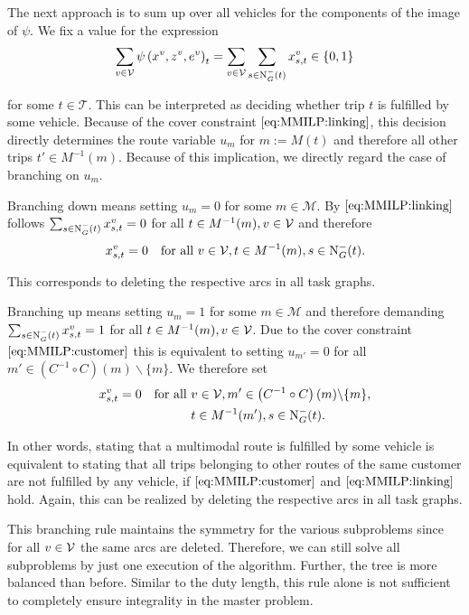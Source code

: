 The next approach is to sum up over all vehicles for the components of the image of $\psi$. We fix a value for the expression
\begin{align*}
	\sum_{v\in\mathcal{V}}\psi\left(x^v,z^v,e^v\right)_t = \sum_{v\in\mathcal{V}} \sum_{s\in\operatorname{N}_G^-(t)} x^v_{s,t} \in\left\{0,1\right\}
\end{align*}

for some $t\in\mathcal{T}$. This can be interpreted as deciding whether trip $t$ is fulfilled by some vehicle. Because of the cover constraint $\eqref{eq:MMILP:linking}$, this decision directly determines the route variable $u_m$ for ${m := M(t)}$ and therefore all other trips ${t'\in M^{-1}(m)}$. Because of this implication, we directly regard the case of branching on $u_m$.

Branching down means setting ${u_m = 0}$ for some ${m\in\mathcal{M}}$. By $\eqref{eq:MMILP:linking}$ follows\linebreak
${\sum_{s\in\operatorname{N}_G^-(t)}x_{s,t}^v = 0}$ for all ${t\in M^{-1}(m)}, v\in\mathcal{V}$ and therefore
\begin{align*}
	x^v_{s,t} = 0 && \text{for all } v\in\mathcal{V}, t\in M^{-1}(m), s\in\operatorname{N}_G^-(t).
\end{align*}

This corresponds to deleting the respective arcs in all task graphs.

Branching up means setting ${u_m = 1}$ for some ${m\in\mathcal{M}}$ and therefore demanding\linebreak
${\sum_{s\in\operatorname{N}_G^-(t)}x_{s,t}^v = 1}$ for all ${t\in M^{-1}(m)}, v\in\mathcal{V}$. Due to the cover constraint $\eqref{eq:MMILP:customer}$ this is equivalent to setting ${u_{m'} = 0}$ for all ${m'\in\left(C^{-1}\circ C\right)(m)\backslash\{m\}}$. We therefore set
\begin{align*}
	x^v_{s,t} = 0 && \text{for all } & v\in\mathcal{V}, m'\in\left(C^{-1}\circ C\right)(m)\backslash\{m\}, \\
	&&& t\in M^{-1}(m'), s\in\operatorname{N}_G^-(t).
\end{align*}

In other words, stating that a multimodal route is fulfilled by some vehicle is equivalent to stating that all trips belonging to other routes of the same customer are not fulfilled by any vehicle, if $\eqref{eq:MMILP:customer}$ and $\eqref{eq:MMILP:linking}$ hold. Again, this can be realized by deleting the respective arcs in all task graphs.

This branching rule maintains the symmetry for the various subproblems since for all $v\in\mathcal{V}$ the same arcs are deleted. Therefore, we can still solve all subproblems by just one execution of the algorithm. Further, the tree is more balanced than before. Similar to the duty length, this rule alone is not sufficient to completely ensure integrality in the master problem.


